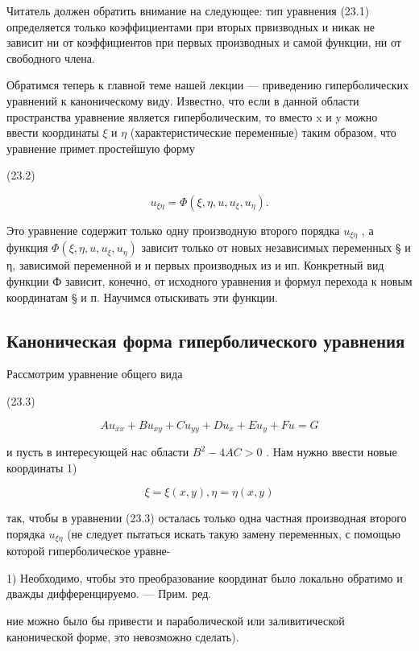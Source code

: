 \documentclass[
  ukrainian,
]{article}
\begin{document}
Читатель должен обратить внимание на следующее: тип уравнения (23.1)
определяется только коэффициентами при вторых првизводных и никак не
зависит ни от коэффициентов при первых производных и самой функции, ни
от свободного члена.

Обратимся теперь к главной теме нашей лекции --- приведению
гиперболических уравнений к каноническому виду. Известно, что если в
данной области пространства уравнение является гиперболическим, то
вместо x и y можно ввести координаты \(\xi\) и \(\eta\)
(характеристические переменные) таким образом, что уравнение примет
простейшую форму

(23.2)

\[
u_{\xi\eta} = \Phi(\xi, \eta, u, u_{\xi}, u_{\eta}).
\]

Это уравнение содержит только одну производную второго порядка
\(u_{\xi\eta}\) , а функция \(\Phi(\xi,\eta,u,u_{\xi},u_{\eta})\)
зависит только от новых независимых переменных § и η, зависимой
переменной и и первых производных из и ип. Конкретный вид функции Ф
зависит, конечно, от исходного уравнения и формул перехода к новым
координатам § и п. Научимся отыскивать эти функции.

\subsection{Каноническая форма гиперболического
уравнения}\label{ux43aux430ux43dux43eux43dux438ux447ux435ux441ux43aux430ux44f-ux444ux43eux440ux43cux430-ux433ux438ux43fux435ux440ux431ux43eux43bux438ux447ux435ux441ux43aux43eux433ux43e-ux443ux440ux430ux432ux43dux435ux43dux438ux44f}

Рассмотрим уравнение общего вида

(23.3)

\[
Au_{xx} + Bu_{xy} + Cu_{yy} + Du_x + Eu_y + Fu = G
\]

и пусть в интересующей нас области \(B^2 - 4AC > 0\) . Нам нужно ввести
новые координаты 1)

\[
\xi = \xi(x, y),
\eta = \eta(x, y)
\]

так, чтобы в уравнении (23.3) осталась только одна частная производная
второго порядка \(u_{\xi\eta}\) (не следует пытаться искать такую замену
переменных, с помощью которой гиперболическое уравне-

1) Необходимо, чтобы это преобразование координат было локально обратимо
и дважды дифференцируемо. --- Прим. ред.

ние можно было бы привести и параболической или заливитической
канонической форме, это невозможно сделать).
\end{document}
